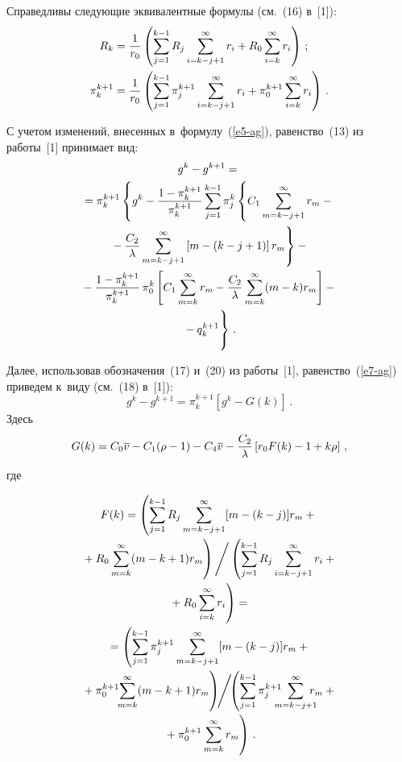 \begin{multicols}{2}
  Справедливы следующие эквивалентные формулы (см.~(16) в~[1]):
  \begin{align}
  R_k&= \displaystyle\frac{\displaystyle 1\mathstrut}{\displaystyle r_0\mathstrut}\left({\sum\limits_{j=1}^{k-1} R_j \sum\limits_{i=k-j+1}^\infty r_i 
+R_0\sum\limits^\infty_{i=k} r_i}\right)\,;\notag\\
  \pi_k^{k+1} &= \displaystyle\frac{\displaystyle 1\mathstrut}{\displaystyle r_0\mathstrut}\left({\sum\limits_{j=1}^{k-1} \pi_j^{k+1}  
\sum\limits_{i=k-j+1}^\infty r_i +\pi_0^{k+1}\sum\limits^\infty_{i=k} r_i}\right)\,.\label{e6-ag}
  \end{align}
  
  С учетом изменений, внесенных в~формулу~(\ref{e5-ag}), равенство~(13) из 
работы~[1] принимает вид: 
  \begin{multline}
  g^k-g^{k+1}={}\\
  {}=\pi_k^{k+1}\left\{ g^k-\fr{1-\pi_k^{k+1}}{\pi_k^{k+1}} 
\sum\limits_{j=1}^{k-1} \pi_j^k \left\{ C_1\sum\limits_{m=k-j+1}^\infty r_m-
{}\right.\right.\\
  \left.{}- \fr{C_2}{\lambda}\sum\limits^\infty_{m=k-j+1}\left[ m-(k-j+1)\right] 
r_m\right\}-{}\\
  {}- \fr{1-\pi_k^{k+1}}{\pi_k^{k+1}}\,\pi_0^k\left[ C_1 
\sum\limits^\infty_{m=k} r_m -\fr{C_2}{\lambda} \sum\limits^\infty_{m=k} (m-k) 
r_m \right] -{}\\
\left.{}-q_k^{k+1}
\vphantom{\fr{1-\pi_k^{k+1}}{\pi_k^{k+1}} 
\sum\limits_{j=1}^{k-1} \pi_j^k}
\right\}\,.
  \label{e7-ag}
  \end{multline}
  
  Далее, использовав обозначения~(17) и~(20) из работы~[1], 
равенство~(\ref{e7-ag}) приведем к~виду (см.~(18) в~[1]):
  \begin{equation}
  g^k-g^{k+1} =\pi_k^{k+1}\left[ g^k-G(k)\right]\,.
  \label{e8-ag}
  \end{equation}
  Здесь
  $$
  G(k) = C_0 \overline{v} -C_1(\rho-1) -C_4\overline{v}  - \displaystyle\frac{\displaystyle C_2\mathstrut}{\displaystyle \lambda\mathstrut} 
\left[ r_0 F(k) -1+k\rho\right]\,,
  $$
где 

\vspace*{-2pt}

\noindent
 \begin{multline*}
  F(k) = \left(\sum\limits_{j=1}^{k-1} R_j \sum\limits^\infty_{m=k-j+1} [m-(k-
j)]r_m+{}\right.\\[-1pt]
\left.{}+R_0 \sum\limits^\infty_{m=k}(m-k+1)r_m
\vphantom{\sum\limits_{j=1}^{k-1}}
\right)\Bigg/
\left( \sum\limits_{j=1}^{k-1} 
R_j \sum\limits^\infty_{i=k-j+1}r_i +{}\right.\\[-1pt]
\left.{}+R_0 \sum\limits^\infty_{i=k}r_i
\vphantom{\sum\limits_{j=1}^{k-1}}\right) ={}\\[-1pt]
  {}= \left(\sum\limits_{j=1}^{k-1} \pi_j^{k+1} \sum\limits^\infty_{m=k-j+1} 
[m-(k-j)]r_m +{}\right.\\[-1pt]
\left.{}+\pi_0^{k+1}\!\! \sum\limits_{m=k}^\infty (m-k+1)r_m 
\vphantom{\sum\limits_{j=1}^{k-1}}\right)\!\!\Bigg/\!\! 
\left(\sum\limits_{j=1}^{k-1} \pi_j^{k+1}\!\!\!\!\! 
\sum\limits^\infty_{m=k-j+1}\!\!\!\! \!r_m 
+{}\right.\\[-1pt]
\left.{}+\pi_0^{k+1} \sum\limits^\infty_{m=k} r_m
\vphantom{\sum\limits_{j=1}^{k-1}}\right)\,.
  \end{multline*}
  

\end{multicols}
